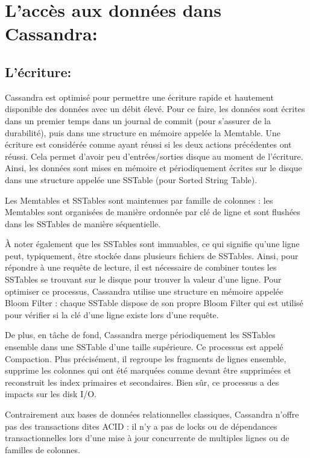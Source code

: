 \section{L'accès aux données dans Cassandra:}

\subsection{L'écriture:}
Cassandra est optimisé pour permettre une écriture rapide et hautement disponible des données avec un débit élevé. Pour ce faire, les données sont écrites dans un premier temps dans un journal de commit (pour s'assurer de la durabilité), puis dans une structure en mémoire appelée la Memtable. Une écriture est considérée comme ayant réussi si les deux actions précédentes ont réussi. Cela permet d'avoir peu d'entrées/sorties disque au moment de l'écriture. Ainsi, les données sont mises en mémoire et périodiquement écrites sur le disque dans une structure appelée une SSTable (pour Sorted String Table).

Les Memtables et SSTables sont maintenues par famille de colonnes : les Memtables sont organisées de manière ordonnée par clé de ligne et sont flushées dans les SSTables de manière séquentielle.

À noter également que les SSTables sont immuables, ce qui signifie qu'une ligne peut, typiquement, être stockée dans plusieurs fichiers de SSTables. Ainsi, pour répondre à une requête de lecture, il est nécessaire de combiner toutes les SSTables se trouvant sur le disque pour trouver la valeur d'une ligne. Pour optimiser ce processus, Cassandra utilise une structure en mémoire appelée Bloom Filter : chaque SSTable dispose de son propre Bloom Filter qui est utilisé pour vérifier si la clé d'une ligne existe lors d'une requête.

De plus, en tâche de fond, Cassandra merge périodiquement les SSTables ensemble dans une SSTable d'une taille supérieure. Ce processus est appelé Compaction. Plus précisément, il regroupe les fragments de lignes ensemble, supprime les colonnes qui ont été marquées comme devant être supprimées et reconstruit les index primaires et secondaires. Bien sûr, ce processus a des impacts sur les disk I/O.

Contrairement aux bases de données relationnelles classiques, Cassandra n'offre pas des transactions dites ACID : il n'y a pas de locks ou de dépendances transactionnelles lors d'une mise à jour concurrente de multiples lignes ou de familles de colonnes.

